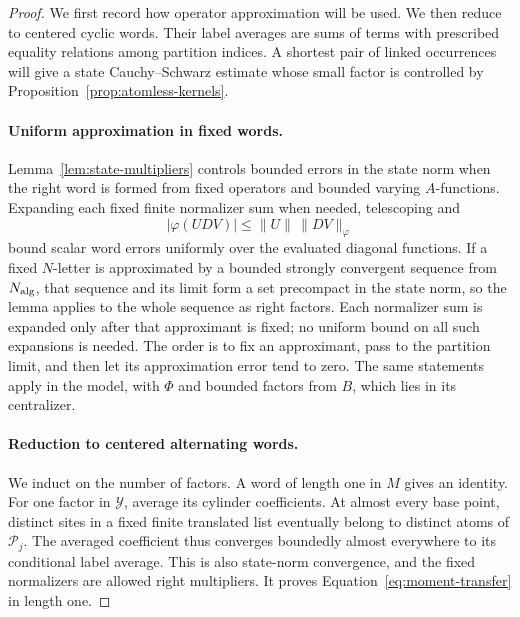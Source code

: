 \begin{proof}
We first record how operator approximation will be used. We then reduce
to centered cyclic words. Their label averages are sums of terms with
prescribed equality relations among partition indices. A shortest pair
of linked occurrences will give a state Cauchy--Schwarz estimate whose
small factor is controlled by Proposition~\ref{prop:atomless-kernels}.

\paragraph{Uniform approximation in fixed words.}
Lemma~\ref{lem:state-multipliers} controls bounded errors in the state
norm when the right word is formed from fixed operators and bounded
varying $A$-functions. Expanding each fixed finite normalizer sum when
needed, telescoping and
\[
 |\varphi(UDV)|\le\|U\|\,\|DV\|_\varphi
\]
bound scalar word errors uniformly over the evaluated diagonal functions.
If a fixed $N$-letter is approximated by a bounded strongly convergent
sequence from $N_{\rm alg}$, that sequence and its limit form a set
precompact in the state norm, so the lemma applies to the whole sequence
as right factors. Each normalizer sum is expanded only after that approximant
is fixed; no uniform bound on all such expansions is needed. The order is
to fix an approximant, pass to the partition limit, and then let its
approximation error tend to zero. The same statements apply in the model,
with $\Phi$ and bounded factors from $B$, which lies in its centralizer.

\paragraph{Reduction to centered alternating words.}
We induct on the number of factors. A word of length one in $M$ gives
an identity. For one factor in $\mathcal Y$, average its cylinder
coefficients. At almost every base point, distinct sites in a fixed
finite translated list eventually belong to distinct atoms of
$\mathcal P_j$. The averaged coefficient thus converges boundedly
almost everywhere to its conditional label average. This is also
state-norm convergence, and the fixed normalizers are allowed right
multipliers. It proves Equation~\eqref{eq:moment-transfer} in length
one.


\end{proof}
